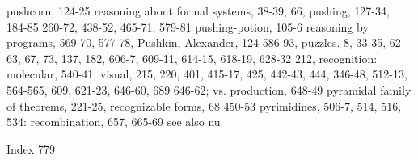 pushcorn, 124-25                               reasoning about formal systems, 38-39, 66,
pushing, 127-34, 184-85                        260-72, 438-52, 465-71, 579-81
pushing-potion, 105-6                          reasoning by programs, 569-70, 577-78,
Pushkin, Alexander, 124                        586-93,
puzzles. 8, 33-35, 62-63, 67, 73, 137, 182,    606-7, 609-11, 614-15, 618-19, 628-32
212,                                           recognition: molecular, 540-41; visual,
215, 220, 401, 415-17, 425, 442-43, 444,       346-48,
512-13, 564-565, 609, 621-23, 646-60, 689      646-62;       vs.     production,     648-49
pyramidal family of theorems, 221-25,          recognizable forms, 68
450-53 pyrimidines, 506-7, 514, 516, 534:      recombination, 657, 665-69
see also nu



Index                                                                                   779

